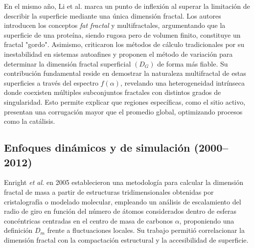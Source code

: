 En el mismo año, Li et al. \cite{HouqiangLi1991} marca un punto de inflexión al superar la limitación de describir la superficie mediante una única dimensión fractal. Los autores introducen los conceptos \textit{fat fractal} y multifractales, argumentando que la superficie de una proteína, siendo rugosa pero de volumen finito, constituye un fractal "gordo". Asimismo, criticaron los métodos de cálculo tradicionales por su inestabilidad en sistemas autoafines y proponen el método de variación para determinar la dimensión fractal superficial $(D_G)$ de forma más fiable. Su contribución fundamental reside en demostrar la naturaleza multifractal de estas superficies a través del espectro $f(\alpha)$, revelando una heterogeneidad intrínseca donde coexisten múltiples subconjuntos fractales con distintos grados de singularidad. Esto permite explicar que regiones específicas, como el sitio activo, presentan una corrugación mayor que el promedio global, optimizando procesos como la catálisis. 



\subsection{Enfoques dinámicos y de simulación (2000--2012)}

Enright \textit{et al.}\cite{Enright2005} en 2005 establecieron una metodología  para calcular la dimensión fractal de masa a partir de estructuras tridimensionales obtenidas por cristalografía o modelado molecular, empleando un análisis de escalamiento del radio de giro en función del número de átomos considerados dentro de esferas concéntricas centradas en el centro de masa de carbonos $\alpha$, proponiendo una definición $D_m$ frente a fluctuaciones locales. Su trabajo permitió correlacionar la dimensión fractal con la compactación estructural y la accesibilidad de superficie.

